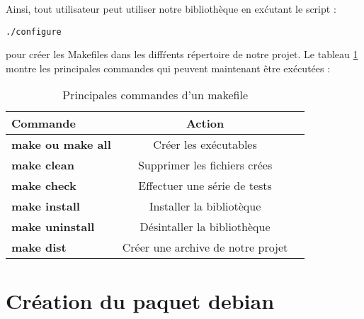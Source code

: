 Ainsi, tout utilisateur peut utiliser notre biblioth\`eque en ex\'cutant le script :
\begin{verbatim}./configure\end{verbatim}
pour cr\'eer les Makefiles dans les diff\'rents r\'epertoire de notre projet.
Le tableau \ref{tab:commandes} montre les principales commandes qui peuvent maintenant \^etre ex\'ecut\'ees :
\begin{table}[h]
\begin{center}

\begin{tabular}{|l|c|r|}
  \hline
  Commande &  Action\\
  \hline
  \textbf{make ou make all} & Cr\'eer les ex\'ecutables \\
  \textbf{make clean} & Supprimer les fichiers cr\'ees\\
  \textbf{make check} & Effectuer une s\'erie de tests \\
  \textbf{make install} & Installer la bibliot\`eque \\
  \textbf{make uninstall} & D\'esintaller la biblioth\`eque \\
  \textbf{make dist} & Cr\'eer une archive de notre projet \\
  \hline
\end{tabular}
\caption{Principales commandes d'un makefile}
\end{center}
\label{tab:commandes}
\end{table}

\section{Cr\'eation du paquet debian}

